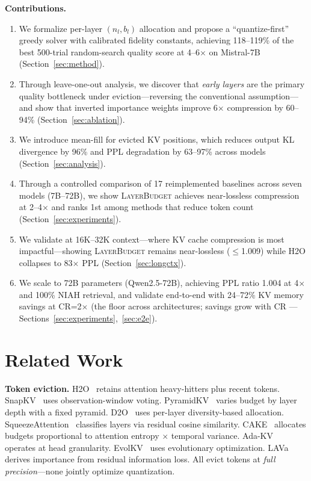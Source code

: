 \documentclass{article}
\newcommand{\layerbudget}{\textsc{LayerBudget}\xspace}
\begin{document}
\textbf{Contributions.}
\begin{enumerate}
    \item We formalize per-layer $(n_l, b_l)$ allocation and propose a ``quantize-first'' greedy solver with calibrated fidelity constants, achieving 118--119\% of the best 500-trial random-search quality score at 4--6$\times$ on Mistral-7B (Section~\ref{sec:method}).
    \item Through leave-one-out analysis, we discover that \emph{early layers} are the primary quality bottleneck under eviction---reversing the conventional assumption---and show that inverted importance weights improve 6$\times$ compression by 60--94\% (Section~\ref{sec:ablation}).
    \item We introduce mean-fill for evicted KV positions, which reduces output KL divergence by 96\% and PPL degradation by 63--97\% across models (Section~\ref{sec:analysis}).
    \item Through a controlled comparison of 17 reimplemented baselines across seven models (7B--72B), we show \layerbudget achieves near-lossless compression at 2--4$\times$ and ranks 1st among methods that reduce token count (Section~\ref{sec:experiments}).
    \item We validate at 16K--32K context---where KV cache compression is most impactful---showing \layerbudget remains near-lossless ($\leq$1.009) while H2O collapses to 83$\times$ PPL (Section~\ref{sec:longctx}).
    \item We scale to 72B parameters (Qwen2.5-72B), achieving PPL ratio 1.004 at 4$\times$ and 100\% NIAH retrieval, and validate end-to-end with 24--72\% KV memory savings at CR=2$\times$ (the floor across architectures; savings grow with CR — Sections~\ref{sec:experiments},~\ref{sec:e2e}).
\end{enumerate}

\section{Related Work}
\label{sec:related}

\textbf{Token eviction.}
H2O~\citep{zhang2024h2o} retains attention heavy-hitters plus recent tokens.
SnapKV~\citep{snapkv2024} uses observation-window voting.
PyramidKV~\citep{pyramidkv2024} varies budget by layer depth with a fixed pyramid.
D2O~\citep{d2o2025} uses per-layer diversity-based allocation.
SqueezeAttention~\citep{squeezeattention2025} classifies layers via residual cosine similarity.
CAKE~\citep{cake2025} allocates budgets proportional to attention entropy $\times$ temporal variance.
Ada-KV~\citep{adakv2025} operates at head granularity.
EvolKV~\citep{evolkv2025} uses evolutionary optimization.
LAVa~\citep{lava2025} derives importance from residual information loss.
All evict tokens at \emph{full precision}---none jointly optimize quantization.
\end{document}
